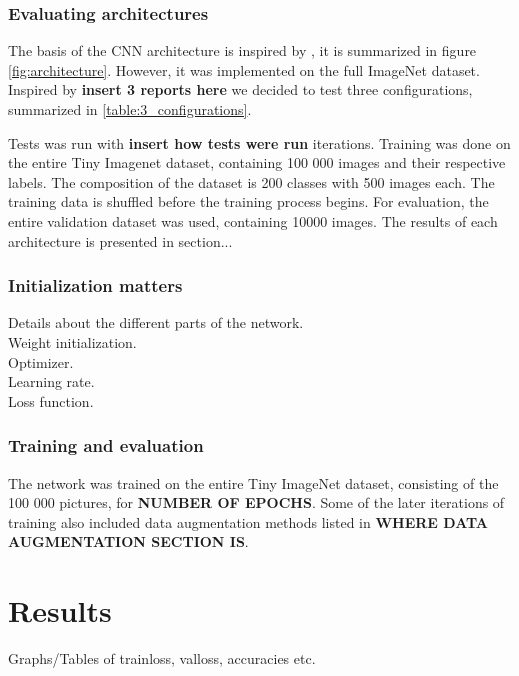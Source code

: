 \documentclass{kthreport}
\begin{document}
\subsubsection{Evaluating architectures}

The basis of the CNN architecture is inspired by \cite{NIPS2012_4824}, it is summarized in figure \ref{fig:architecture}. However, it was implemented on the full ImageNet dataset. Inspired by \textbf{insert 3 reports here} we decided to test three configurations, summarized in \ref{table:3_configurations}.


\FloatBarrier


\FloatBarrier


Tests was run with \textbf{insert how tests were run} iterations. Training was done on the entire Tiny Imagenet dataset, containing 100 000 images and their respective labels. The composition of the dataset is 200 classes with 500 images each. The training data is shuffled before the training process begins. For evaluation, the entire validation dataset was used, containing 10000 images. The results of each architecture is presented in section...

\subsubsection{Initialization matters}

Details about the different parts of the network.\\
Weight initialization.\\
Optimizer.\\
Learning rate.\\
Loss function.\\




\subsubsection{Training and evaluation}
The network was trained on the entire Tiny ImageNet dataset, consisting of the 100 000 pictures, for \textbf{NUMBER OF EPOCHS}. Some of the later iterations of training also included data augmentation methods listed in \textbf{WHERE DATA AUGMENTATION SECTION IS}. 

\section{Results}
Graphs/Tables of trainloss, valloss, accuracies etc. 
\end{document}
